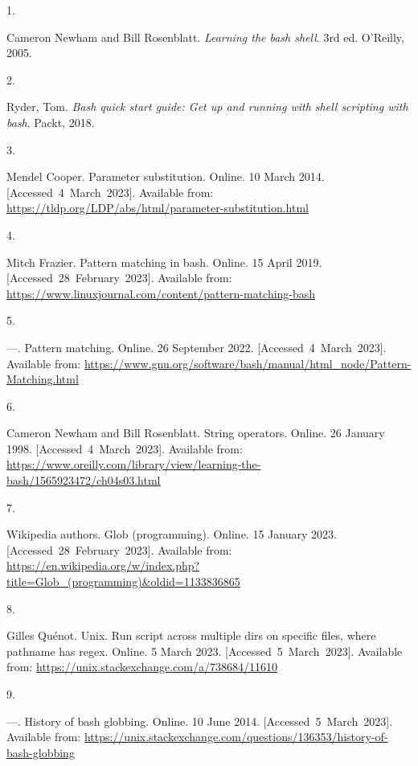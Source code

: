 \documentclass[
  a4paper,
]{article}
\newlength{\cslhangindent}
\newlength{\csllabelwidth}
\newlength{\cslentryspacingunit} %
\newenvironment{CSLReferences}[2] %
 {%
  \setlength{\parindent}{0pt}
  \ifodd #1
  \let\oldpar\par
  \def\par{\hangindent=\cslhangindent\oldpar}
  \fi
  \setlength{\parskip}{#2\cslentryspacingunit}
 }%
 {}
\newcommand{\CSLLeftMargin}[1]{\parbox[t]{\csllabelwidth}{#1}}
\newcommand{\CSLRightInline}[1]{\parbox[t]{\linewidth - \csllabelwidth}{#1}\break}
\begin{document}
\hypertarget{refs}{}
\begin{CSLReferences}{0}{0}
\leavevmode{}%
\CSLLeftMargin{1. }%
\CSLRightInline{Cameron Newham and Bill Rosenblatt. \emph{Learning the
bash shell}. 3rd ed. O'Reilly, 2005. }

\leavevmode{}%
\CSLLeftMargin{2. }%
\CSLRightInline{Ryder, Tom. \emph{Bash quick start guide: Get up and
running with shell scripting with bash}. Packt, 2018. }

\leavevmode{}%
\CSLLeftMargin{3. }%
\CSLRightInline{Mendel Cooper. Parameter substitution. Online. 10 March
2014. {[}Accessed~4~March~2023{]}. Available from:
\url{https://tldp.org/LDP/abs/html/parameter-substitution.html}}

\leavevmode{}%
\CSLLeftMargin{4. }%
\CSLRightInline{Mitch Frazier. Pattern matching in bash. Online. 15
April 2019. {[}Accessed~28~February~2023{]}. Available from:
\url{https://www.linuxjournal.com/content/pattern-matching-bash}}

\leavevmode{}%
\CSLLeftMargin{5. }%
\CSLRightInline{---. Pattern matching. Online. 26 September 2022.
{[}Accessed~4~March~2023{]}. Available from:
\url{https://www.gnu.org/software/bash/manual/html_node/Pattern-Matching.html}}

\leavevmode{}%
\CSLLeftMargin{6. }%
\CSLRightInline{Cameron Newham and Bill Rosenblatt. String operators.
Online. 26 January 1998. {[}Accessed~4~March~2023{]}. Available from:
\url{https://www.oreilly.com/library/view/learning-the-bash/1565923472/ch04s03.html}}

\leavevmode{}%
\CSLLeftMargin{7. }%
\CSLRightInline{Wikipedia authors. Glob (programming). Online. 15
January 2023. {[}Accessed~28~February~2023{]}. Available from:
\url{https://en.wikipedia.org/w/index.php?title=Glob_(programming)\&oldid=1133836865}}

\leavevmode{}%
\CSLLeftMargin{8. }%
\CSLRightInline{Gilles Quénot. Unix. Run script across multiple dirs on
specific files, where pathname has regex. Online. 5 March 2023.
{[}Accessed~5~March~2023{]}. Available from:
\url{https://unix.stackexchange.com/a/738684/11610}}

\leavevmode{}%
\CSLLeftMargin{9. }%
\CSLRightInline{---. History of bash globbing. Online. 10 June 2014.
{[}Accessed~5~March~2023{]}. Available from:
\url{https://unix.stackexchange.com/questions/136353/history-of-bash-globbing}}


\end{CSLReferences}
\end{document}

